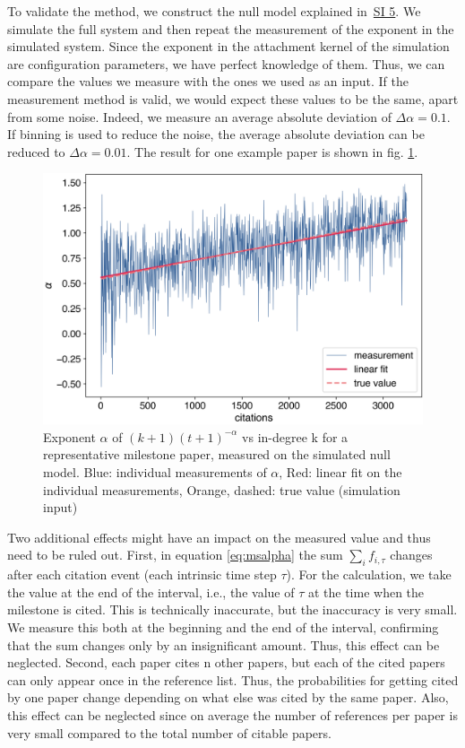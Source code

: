 \documentclass[fleqn,10pt]{wlscirep}
\begin{document}
To validate the method, we construct the null model explained in~\hyperref[SI5]{SI 5}. We simulate the full system and then repeat the measurement of the exponent in the simulated system. Since the exponent in the attachment kernel of the simulation are configuration parameters, we have perfect knowledge of them. Thus, we can compare the values we measure with the ones we used as an input. If the measurement method is valid, we would expect these values to be the same, apart from some noise. Indeed, we measure an average absolute deviation of $\Delta\alpha=0.1$. If binning is used to reduce the noise, the average absolute deviation can be reduced to $\Delta\alpha=0.01$. The result for one example paper is shown in fig. \ref{fig_mspexp}.

\begin{figure}[h!]
	\centering
	 \includegraphics[width=0.7\columnwidth]{7.png}
	\caption{Exponent $\alpha$ of $(k+1)(t + 1)^{-\alpha}$ vs in-degree k for a representative milestone paper, measured on the simulated null model. Blue: individual measurements of $\alpha$, Red: linear fit on the individual measurements, Orange, dashed: true value (simulation input)
	}
	\label{fig_mspexp}
\end{figure}

Two additional effects might have an impact on the measured value and thus need to be ruled out. First, in equation \ref{eq:msalpha} the sum $\sum_i f_{i,\tau}$ changes after each citation event (each intrinsic time step $\tau$). For the calculation, we take the value at the end of the interval, i.e., the value of $\tau$ at the time when the milestone is cited. This is technically inaccurate, but the inaccuracy is very small. We measure this both at the beginning and the end of the interval, confirming that the sum changes only by an insignificant amount. Thus, this effect can be neglected.
Second, each paper cites n other papers, but each of the cited papers can only appear once in the reference list. Thus, the probabilities for getting cited by one paper change depending on what else was cited by the same paper. Also, this effect can be neglected since on average the number of references per paper is very small compared to the total number of citable papers. 
\end{document}
